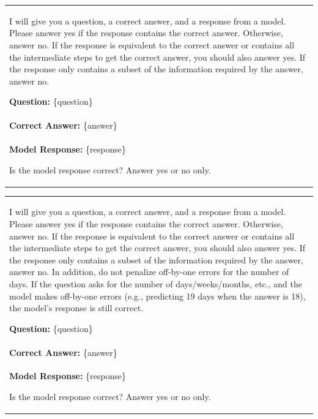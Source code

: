 \documentclass[11pt]{article}
\begin{document}
\begin{table}[!b]  
\begin{tcolorbox}[
    colback=black!5, %
    colframe=black!70!white, %
    title=Standard Tasks (Single-session-user/assistant\, Multi-session) for LongMemEval Dataset,
    fonttitle=\bfseries,
    arc=3mm, %
    boxrule=0.8pt %
]
\begin{tabularx}{\textwidth}{X}
I will give you a question, a correct answer, and a response from a model. Please answer yes if the response contains the correct answer. Otherwise, answer no. If the response is equivalent to the correct answer or contains all the intermediate steps to get the correct answer, you should also answer yes. If the response only contains a subset of the information required by the answer, answer no.

\textbf{Question:} \{question\}\\
\textbf{Correct Answer:} \{answer\}\\
\textbf{Model Response:} \{response\}

Is the model response correct? Answer yes or no only.
\end{tabularx}
\end{tcolorbox}
\end{table}

\begin{table}[!b]  
\begin{tcolorbox}[
    colback=black!5, %
    colframe=black!70!white, %
    title=Temporal Reasoning Tasks for LongMemEval Dataset,
    fonttitle=\bfseries,
    arc=3mm, %
    boxrule=0.8pt %
]
\begin{tabularx}{\textwidth}{X}
I will give you a question, a correct answer, and a response from a model. Please answer yes if the response contains the correct answer. Otherwise, answer no. If the response is equivalent to the correct answer or contains all the intermediate steps to get the correct answer, you should also answer yes. If the response only contains a subset of the information required by the answer, answer no. In addition, do not penalize off-by-one errors for the number of days. If the question asks for the number of days/weeks/months, etc., and the model makes off-by-one errors (e.g., predicting 19 days when the answer is 18), the model's response is still correct.

\textbf{Question:} \{question\}\\
\textbf{Correct Answer:} \{answer\}\\
\textbf{Model Response:} \{response\}

Is the model response correct? Answer yes or no only.
\end{tabularx}
\end{tcolorbox}
\end{table}
\end{document}
